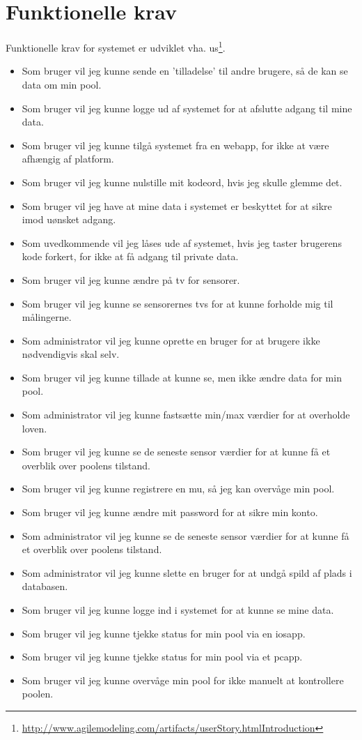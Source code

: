 \section{Funktionelle krav}
Funktionelle krav for systemet er udviklet vha. \gls{us}\footnote{\url{http://www.agilemodeling.com/artifacts/userStory.htmlIntroduction}}.

\begin{itemize}
	\item Som bruger vil jeg kunne sende en ’tilladelse’ til andre brugere, så de kan se data om min pool.
	\item Som bruger vil jeg kunne logge ud af systemet for at afslutte adgang til mine data.
	\item Som bruger vil jeg kunne tilgå systemet fra en \gls{webapp}, for ikke at være afhængig af platform.
	\item Som bruger vil jeg kunne nulstille mit kodeord, hvis jeg skulle glemme det.
	\item Som bruger vil jeg have at mine data i systemet er beskyttet for at sikre imod uønsket adgang.
	\item Som uvedkommende vil jeg låses ude af systemet, hvis jeg taster brugerens kode forkert, for ikke at få adgang til private data.
	\item Som bruger vil jeg kunne ændre på \gls{tv} for sensorer.
	\item Som bruger vil jeg kunne se sensorernes \glspl{tv} for at kunne forholde mig til målingerne.
	\item Som administrator vil jeg kunne oprette en bruger for at brugere ikke nødvendigvis skal selv.
	\item Som bruger vil jeg kunne tillade at kunne se, men ikke ændre data for min pool.
	\item Som administrator vil jeg kunne fastsætte min/max værdier for at overholde loven.
	\item Som bruger vil jeg kunne se de seneste sensor værdier for at kunne få et overblik over poolens tilstand.
	\item Som bruger vil jeg kunne registrere en \gls{mu}, så jeg kan overvåge min pool.
	\item Som bruger vil jeg kunne ændre mit password for at sikre min konto.
	\item Som administrator vil jeg kunne se de seneste sensor værdier for at kunne få et overblik over poolens tilstand.
	\item Som administrator vil jeg kunne slette en bruger for at undgå spild af plads i databasen.
	\item Som bruger vil jeg kunne logge ind i systemet for at kunne se mine data.
	\item Som bruger vil jeg kunne tjekke status for min pool via en \gls{iosapp}.
	\item Som bruger vil jeg kunne tjekke status for min pool via et \gls{pcapp}.
	\item Som bruger vil jeg kunne overvåge min pool for ikke manuelt at kontrollere poolen.
\end{itemize}

\newpage